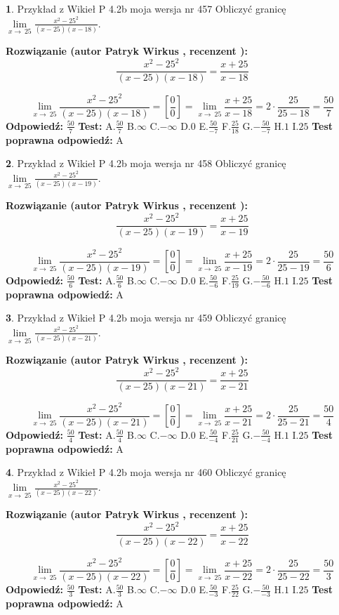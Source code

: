 \documentclass[12pt, a4paper]{article}
\theoremstyle{definition} %
\newtheorem{zad}{}
\newcommand{\zadStart}[1]{\begin{zad}#1\newline}
\newcommand{\zadStop}{\end{zad}}
\newcommand{\rozwStart}[2]{\noindent \textbf{Rozwiązanie (autor #1 , recenzent #2): }\newline}
\newcommand{\rozwStop}{\newline}
\newcommand{\odpStart}{\noindent \textbf{Odpowiedź:}\newline}
\newcommand{\odpStop}{\newline}
\newcommand{\testStart}{\noindent \textbf{Test:}\newline}
\newcommand{\testStop}{\newline}
\newcommand{\kluczStart}{\noindent \textbf{Test poprawna odpowiedź:}\newline}
\newcommand{\kluczStop}{\newline}
\begin{document}
\zadStart{Przykład z Wikieł P 4.2b moja wersja nr 457}
Obliczyć granicę $\lim\limits_{x\to\ 25}\frac{x^{2}-25^{2}}{(x-25)(x-18)}$.
\zadStop
\rozwStart{Patryk Wirkus}{}
$$\frac{x^{2}-25^{2}}{(x-25)(x-18)}=\frac{x+25}{x-18}$$

$$\lim\limits_{x\to\ 25}\frac{x^{2}-25^{2}}{(x-25)(x-18)}=[\frac{0}{0}]=\lim\limits_{x\to\ 25}\frac{x+25}{x-18}=2 \cdot \frac{25}{25-18} = \frac{50}{7}$$
\rozwStop
\odpStart
$\frac{50}{7}$
\odpStop
\testStart
A.$\frac{50}{7}$
B.$\infty$
C.$-\infty$
D.$0$
E.$\frac{50}{-7}$
F.$\frac{25}{18}$
G.$-\frac{50}{-7}$
H.$1$
I.$25$
\testStop
\kluczStart
A
\kluczStop



\zadStart{Przykład z Wikieł P 4.2b moja wersja nr 458}
Obliczyć granicę $\lim\limits_{x\to\ 25}\frac{x^{2}-25^{2}}{(x-25)(x-19)}$.
\zadStop
\rozwStart{Patryk Wirkus}{}
$$\frac{x^{2}-25^{2}}{(x-25)(x-19)}=\frac{x+25}{x-19}$$

$$\lim\limits_{x\to\ 25}\frac{x^{2}-25^{2}}{(x-25)(x-19)}=[\frac{0}{0}]=\lim\limits_{x\to\ 25}\frac{x+25}{x-19}=2 \cdot \frac{25}{25-19} = \frac{50}{6}$$
\rozwStop
\odpStart
$\frac{50}{6}$
\odpStop
\testStart
A.$\frac{50}{6}$
B.$\infty$
C.$-\infty$
D.$0$
E.$\frac{50}{-6}$
F.$\frac{25}{19}$
G.$-\frac{50}{-6}$
H.$1$
I.$25$
\testStop
\kluczStart
A
\kluczStop



\zadStart{Przykład z Wikieł P 4.2b moja wersja nr 459}
Obliczyć granicę $\lim\limits_{x\to\ 25}\frac{x^{2}-25^{2}}{(x-25)(x-21)}$.
\zadStop
\rozwStart{Patryk Wirkus}{}
$$\frac{x^{2}-25^{2}}{(x-25)(x-21)}=\frac{x+25}{x-21}$$

$$\lim\limits_{x\to\ 25}\frac{x^{2}-25^{2}}{(x-25)(x-21)}=[\frac{0}{0}]=\lim\limits_{x\to\ 25}\frac{x+25}{x-21}=2 \cdot \frac{25}{25-21} = \frac{50}{4}$$
\rozwStop
\odpStart
$\frac{50}{4}$
\odpStop
\testStart
A.$\frac{50}{4}$
B.$\infty$
C.$-\infty$
D.$0$
E.$\frac{50}{-4}$
F.$\frac{25}{21}$
G.$-\frac{50}{-4}$
H.$1$
I.$25$
\testStop
\kluczStart
A
\kluczStop



\zadStart{Przykład z Wikieł P 4.2b moja wersja nr 460}
Obliczyć granicę $\lim\limits_{x\to\ 25}\frac{x^{2}-25^{2}}{(x-25)(x-22)}$.
\zadStop
\rozwStart{Patryk Wirkus}{}
$$\frac{x^{2}-25^{2}}{(x-25)(x-22)}=\frac{x+25}{x-22}$$

$$\lim\limits_{x\to\ 25}\frac{x^{2}-25^{2}}{(x-25)(x-22)}=[\frac{0}{0}]=\lim\limits_{x\to\ 25}\frac{x+25}{x-22}=2 \cdot \frac{25}{25-22} = \frac{50}{3}$$
\rozwStop
\odpStart
$\frac{50}{3}$
\odpStop
\testStart
A.$\frac{50}{3}$
B.$\infty$
C.$-\infty$
D.$0$
E.$\frac{50}{-3}$
F.$\frac{25}{22}$
G.$-\frac{50}{-3}$
H.$1$
I.$25$
\testStop
\kluczStart
A
\kluczStop
\end{document}
